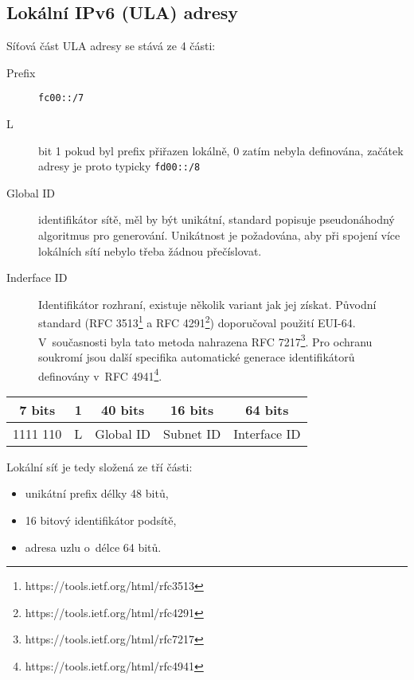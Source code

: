 \subsection{Lokální IPv6 (ULA) adresy}\label{ula}
Síťová část ULA adresy se stává ze 4 části:
\begin{description}
    \item [Prefix] {\tt fc00::/7}
    \item [L] bit 1 pokud byl prefix přiřazen lokálně, 0 zatím nebyla
        definována, začátek adresy je proto typicky {\tt fd00::/8}
    \item [Global ID] identifikátor sítě, měl by být unikátní, standard
        popisuje pseudonáhodný algoritmus pro generování. Unikátnost je
        požadována, aby při spojení více lokálních sítí nebylo třeba žádnou
        přečíslovat.
    \item [Inderface ID] Identifikátor rozhraní, existuje několik variant jak
        jej získat. Původní standard (RFC
        3513\footnote{https://tools.ietf.org/html/rfc3513} a RFC
        4291\footnote{https://tools.ietf.org/html/rfc4291}) doporučoval použití
        EUI-64. V~současnosti byla tato metoda nahrazena RFC
        7217\footnote{https://tools.ietf.org/html/rfc7217}. Pro ochranu
        soukromí jsou další specifika automatické generace identifikátorů
        definovány v~RFC 4941\footnote{https://tools.ietf.org/html/rfc4941}.
\end{description}

\begin{table}[ht!]
    \begin{center}
        \begin{tabular}{c|c|c|c|c}
            7 bits & 1 &  40 bits  &  16 bits  & 64 bits \\
            \hline
            1111 110 & L & Global ID & Subnet ID & Interface ID \\
            \hline
        \end{tabular}
    \end{center}
\end{table}

Lokální síť je tedy složená ze tří části:
\begin{itemize}
    \item unikátní prefix délky 48 bitů,
    \item 16 bitový identifikátor podsítě,
    \item adresa uzlu o~délce 64 bitů.
\end{itemize}
